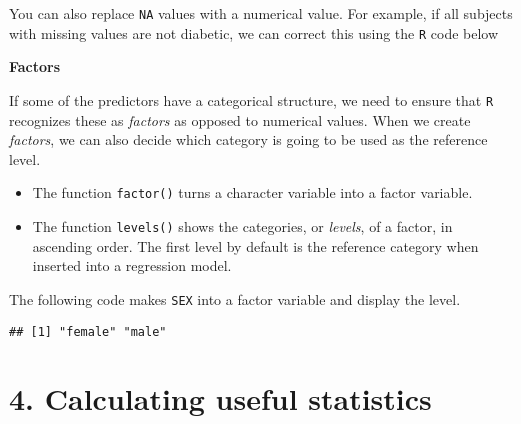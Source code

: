 \documentclass[
]{article}
\newenvironment{Shaded}{\begin{snugshade}}{\end{snugshade}}
\newcommand{\CommentTok}[1]{\textcolor[rgb]{0.56,0.35,0.01}{\textit{#1}}}
\newcommand{\DecValTok}[1]{\textcolor[rgb]{0.00,0.00,0.81}{#1}}
\newcommand{\KeywordTok}[1]{\textcolor[rgb]{0.13,0.29,0.53}{\textbf{#1}}}
\newcommand{\NormalTok}[1]{#1}
\newcommand{\OperatorTok}[1]{\textcolor[rgb]{0.81,0.36,0.00}{\textbf{#1}}}
\newcommand{\StringTok}[1]{\textcolor[rgb]{0.31,0.60,0.02}{#1}}
\begin{document}
You can also replace \texttt{NA} values with a numerical value. For
example, if all subjects with missing values are not diabetic, we can
correct this using the \texttt{R} code below

\begin{Shaded}
\end{Shaded}

\textbf{Factors}

If some of the predictors have a categorical structure, we need to
ensure that \texttt{R} recognizes these as \emph{factors} as opposed to
numerical values. When we create \emph{factors}, we can also decide
which category is going to be used as the reference level.

\begin{itemize}
\item
  The function \texttt{factor()} turns a character variable into a
  factor variable.
\item
  The function \texttt{levels()} shows the categories, or \emph{levels},
  of a factor, in ascending order. The first level by default is the
  reference category when inserted into a regression model.
\end{itemize}

The following code makes \texttt{SEX} into a factor variable and display
the level.

\begin{Shaded}
\end{Shaded}

\begin{verbatim}
## [1] "female" "male"
\end{verbatim}

\hypertarget{calculating-useful-statistics}{%
\section{4. Calculating useful
statistics}\label{calculating-useful-statistics}}
\end{document}
